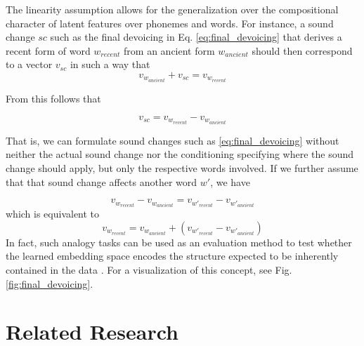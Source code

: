 \documentclass[6pt]{article}
\begin{document}
The linearity assumption allows for the generalization over the compositional character of latent features over phonemes and words. For instance, a sound change $sc$ such as the final devoicing in Eq. \ref{eq:final_devoicing} that derives a recent form of word $w_{recent}$ from an ancient form  $w_{ancient}$ should then correspond to a vector $v_{sc}$ in such a way that 
\begin{equation}
\label{eq:sound_change_linear_dependency}
v_{w_{ancient}}+v_{sc} = v_{w_{recent}}
\end{equation}

From this follows that 

\begin{equation}
v_{sc} =  v_{w_{recent}} - v_{w_{ancient}} 
\end{equation}

That is, we can formulate sound changes such as \ref{eq:final_devoicing} without neither the actual sound change nor the conditioning specifying where the sound change should apply, but only the respective words involved.
If we further assume that that sound change affects another word $w'$, we have

\begin{equation}
v_{w_{recent}} - v_{w_{ancient}}  =  v_{w'_{recent}} - v_{w'_{ancient}} 
\end{equation}
which is equivalent to
\begin{equation}
v_{w_{recent}}  =   v_{w_{ancient}}  + (v_{w'_{recent}} - v_{w'_{ancient}}) 
\end{equation}
In fact, such analogy tasks can be used as an evaluation method to test whether the learned embedding space encodes the structure expected to be inherently contained in the data \citep{mikolov2013distributed}. For a visualization of this concept, see Fig. \ref{fig:final_devoicing}.
 

\section{Related Research}
\end{document}
